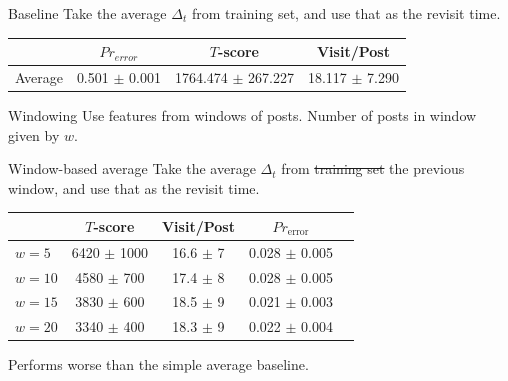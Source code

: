 \documentclass[12pt]{../presentation}
\begin{document}
\begin{frame}{Baseline}
Take the average $\Delta_t$ from training set, and use that as the revisit time.
	\begin{center}
		\begin{tabular}{ | l | c | c | c | }
			\hline
		& $Pr_{error}$		  & $T$-score			   &	Visit/Post\\
			\hline
 Average &		0.501 $\pm$ 0.001 &	1764.474 $\pm$ 267.227  &	18.117 $\pm$ 7.290 \\
			\hline
		\end{tabular}
	\end{center}

\end{frame}

\begin{frame}{Windowing}
Use features from windows of posts. Number of posts in window given by $w$.
\begin{center}

\end{center}
\end{frame}


\begin{frame}{Window-based average}
	Take the average $\Delta_t$ from \sout{training set} the previous window, and use that as the revisit time.
	\begin{center}
		\scriptsize
		\begin{tabular}{ | l | c | c | c | c |}
			\hline
						&	        $T$-score &	       		Visit/Post	  & $Pr_{\text{error}}$\\
			\hline
		 $w = 5$		&	6420 $\pm$ 1000	&  16.6 $\pm$ 7 &	0.028 $\pm$ 0.005  \\
		 $w = 10$		&	4580 $\pm$ 700	&  17.4 $\pm$ 8 &	0.028 $\pm$ 0.005  \\
		 $w = 15$		&	3830 $\pm$ 600	&  18.5 $\pm$ 9 &	0.021 $\pm$ 0.003  \\
		 $w = 20$		&	3340 $\pm$ 400	&  18.3 $\pm$ 9 &	0.022 $\pm$ 0.004  \\
			\hline
		\end{tabular}
	\end{center}
	Performs worse than the simple average baseline.
\end{frame}
\end{document}
